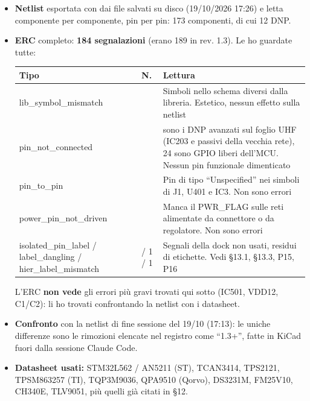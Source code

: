 \begin{itemize}
\item \textbf{Netlist} esportata con  dai file salvati su disco (19/\allowbreak{}10/\allowbreak{}2026 17:26) e letta componente per componente, pin per pin: 173 componenti, di cui 12 DNP.
\item \textbf{ERC} completo: \textbf{184 segnalazioni} (erano 189 in rev. 1.3). Le ho guardate tutte:
{\small{}\setlength{\tabcolsep}{4pt}\renewcommand{\arraystretch}{1.1}
\begin{longtable}{>{\raggedright\arraybackslash}p{}>{\raggedright\arraybackslash}p{}>{\raggedright\arraybackslash}p{}}
\toprule
\textbf{Tipo} & \textbf{N.} & \textbf{Lettura} \\
\midrule
\endhead
\bottomrule\endfoot
lib\_\allowbreak{}symbol\_\allowbreak{}mismatch & 80 & Simboli nello schema diversi dalla libreria. Estetico, nessun effetto sulla netlist \\\midrule[0.15pt]
pin\_\allowbreak{}not\_\allowbreak{}connected & 71 & 47 sono i DNP avanzati sul foglio UHF (IC203 e passivi della vecchia rete), 24 sono GPIO liberi dell'MCU. Nessun pin funzionale dimenticato \\\midrule[0.15pt]
pin\_\allowbreak{}to\_\allowbreak{}pin & 19 & Pin di tipo \textquotedblleft{}Unspecified\textquotedblright{} nei simboli di J1, U401 e IC3. Non sono errori \\\midrule[0.15pt]
power\_\allowbreak{}pin\_\allowbreak{}not\_\allowbreak{}driven & 6 & Manca il PWR\_\allowbreak{}FLAG sulle reti alimentate da connettore o da regolatore. Non sono errori \\\midrule[0.15pt]
isolated\_\allowbreak{}pin\_\allowbreak{}label /\allowbreak{} label\_\allowbreak{}dangling /\allowbreak{} hier\_\allowbreak{}label\_\allowbreak{}mismatch & 6 /\allowbreak{} 1 /\allowbreak{} 1 & Segnali della dock non usati, residui di etichette. Vedi §13.1, §13.3, P15, P16 \\
\end{longtable}}
 L'ERC \textbf{non vede} gli errori più gravi trovati qui sotto (IC501, VDD12, C1/\allowbreak{}C2): li ho trovati confrontando la netlist con i datasheet.
\item \textbf{Confronto} con la netlist di fine sessione del 19/\allowbreak{}10 (17:13): le uniche differenze sono le rimozioni elencate nel registro come \textquotedblleft{}1.3+\textquotedblright{}, fatte in KiCad fuori dalla sessione Claude Code.
\item \textbf{Datasheet usati:} STM32L562 /\allowbreak{} AN5211 (ST), TCAN3414, TPS2121, TPSM863257 (TI), TQP3M9036, QPA9510 (Qorvo), DS3231M, FM25V10, CH340E, TLV9051, più quelli già citati in §12.
\end{itemize}

